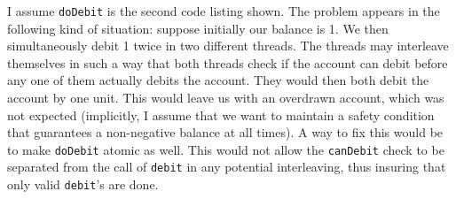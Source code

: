 I assume \texttt{doDebit} is the second code listing shown. The problem appears in the following kind of situation: suppose initially our balance is 1. We then simultaneously debit 1 twice in two different threads. The threads may interleave themselves in such a way that both threads check if the account can debit before any one of them actually debits the account. They would then both debit the account by one unit. This would leave us with an overdrawn account, which was not expected (implicitly, I assume that we want to maintain a safety condition that guarantees a non-negative balance at all times). A way to fix this would be to make \texttt{doDebit} atomic as well. This would not allow the \texttt{canDebit} check to be separated from the call of \texttt{debit} in any potential interleaving, thus insuring that only valid \texttt{debit}'s are done.

